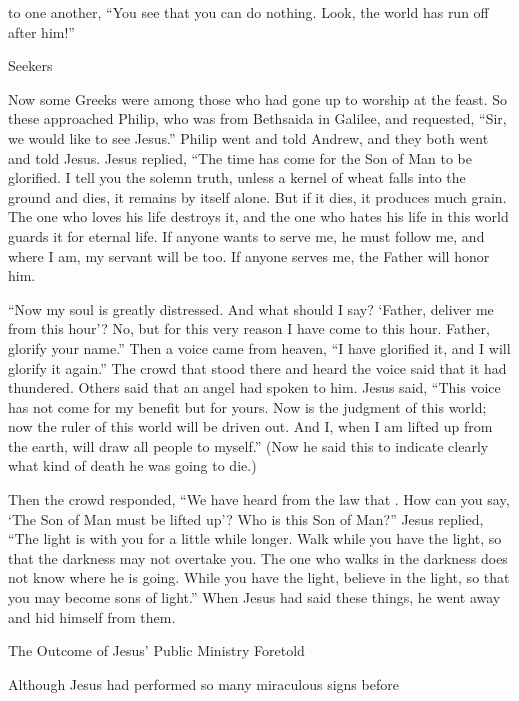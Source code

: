 {to
one another,
“You see
that
you can do
nothing.
Look,
the world
has run off
after
him!”
\par }{\SH Seekers
\par }{\PP {}Now
some
Greeks
were
among
those who had gone up
to
worship
at
the feast.
So
these
approached
Philip,
who was from
Bethsaida
in Galilee,
and
requested, “Sir,
we would like
to see
Jesus.”
Philip
went
and
told
Andrew,
and they
both went
and
told
Jesus.
Jesus
replied, “The time
has come
for the Son
of Man
to
be glorified.
I tell
you
the solemn truth,
unless
a kernel
of wheat
falls
into
the ground
and dies,
it remains
by itself
alone.
But
if
it dies,
it produces
much
grain.
The one who loves
his
life
destroys
it,
and
the one who hates
his
life
in
this
world
guards
it
for
eternal
life.
If
anyone
wants to serve
me,
he must follow
me,
and
where
I
am,
my
servant
will be
too.
If
anyone
serves
me,
the Father
will honor
him.
\par }{\PP {}“Now
my
soul
is
greatly distressed.
And
what
should I say? ‘Father,
deliver
me
from
this
hour’? No, but
for
this
very reason
I have come
to
this
hour.
Father,
glorify
your
name.”
Then
a voice
came
from
heaven, “I have glorified
it, and
I will glorify
it again.”
The crowd
that stood
there and
heard
the voice said
that it had
thundered.
Others
said
that an angel
had spoken
to him.
Jesus
said, “This
voice
has
not
come
for
my benefit
but
for
yours.
Now
is
the judgment
of this
world;
now
the ruler
of this
world
will be driven
out.
And I,
when
I am lifted up
from
the earth,
will draw
all people
to
myself.”
(Now
he said
this
to indicate clearly
what kind
of death
he was going
to die.)
\par }{\PP {}Then
the crowd
responded, “We
have heard
from
the law
that
{}
{}. How
can
you
say,
‘The Son
of Man
must
be lifted up’? Who
is
this
Son
of Man?”
Jesus
replied, “The light
is
with
you
for a little
while
longer.
Walk
while
you have
the light,
so that
the darkness
may
not
overtake
you.
The one who walks
in
the darkness
does
not
know
where
he is going.
While
you have
the light,
believe
in
the light,
so that
you may become
sons
of light.”
When Jesus
had said
these things,
he went away
and
hid
himself from
them.
\par }{\SH The Outcome of Jesus’ Public Ministry Foretold
\par }{\PP {}Although
Jesus
had performed
so many
miraculous signs
before
}
